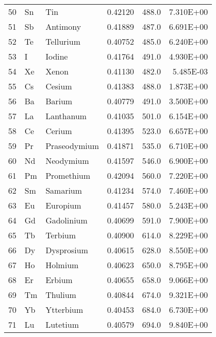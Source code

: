 \begin{tabular}{l|l|l|l|l|r}
50 &	Sn &	Tin	 &   0.42120 &	488.0 &	7.310E+00 \\
51 &	Sb &	Antimony & 	0.41889	& 487.0 &	6.691E+00 \\
52 &	Te &	Tellurium &	0.40752	& 485.0 &	6.240E+00 \\
53 &	I  &	Iodine &	0.41764	& 491.0 &	4.930E+00 \\
54 &	Xe &	Xenon  &	0.41130	& 482.0 &	5.485E-03 \\
55 &	Cs &	Cesium &	0.41383	& 488.0 &	1.873E+00 \\
56 &	Ba &	Barium &	0.40779	& 491.0 &	3.500E+00 \\
57 &	La &	Lanthanum &	0.41035	& 501.0 &	6.154E+00 \\
58 &	Ce &	Cerium &	0.41395	& 523.0 &	6.657E+00 \\
59 &	Pr &	Praseodymium &	0.41871	& 535.0 &	6.710E+00 \\
60 &	Nd &	Neodymium  & 	0.41597	& 546.0 &	6.900E+00 \\
61 &	Pm &	Promethium &	0.42094	& 560.0 &	7.220E+00 \\
62 &	Sm &	Samarium   &	0.41234	& 574.0 &	7.460E+00 \\
63 &	Eu &	Europium   &	0.41457	& 580.0 &	5.243E+00 \\
64 &	Gd &	Gadolinium &	0.40699	& 591.0 &	7.900E+00 \\
65 &	Tb &	Terbium &	0.40900	& 614.0 &	8.229E+00 \\
66 &	Dy &	Dysprosium &	0.40615 &	628.0 &	8.550E+00 \\
67 &	Ho &	Holmium &	0.40623 &	650.0 &	8.795E+00 \\
68 &	Er &	Erbium  &	0.40655 &	658.0 &	9.066E+00 \\
69 &	Tm &	Thulium &	0.40844 &	674.0 &	9.321E+00 \\
70 &	Yb &	Ytterbium &	0.40453 &	684.0 &	6.730E+00 \\
71 &	Lu &	Lutetium &	0.40579 &	694.0 &	9.840E+00 \\
\end{tabular}

